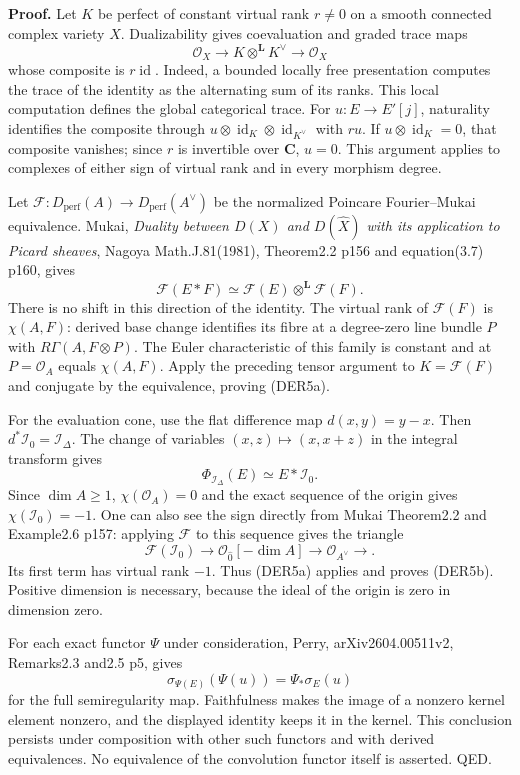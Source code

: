 \documentclass[11pt,a4paper]{article}
\theoremstyle{definition}
\begin{document}
\textbf{Proof.} Let \(K\) be perfect of constant virtual rank \(r\ne0\)
on a smooth connected complex variety \(X\). Dualizability gives
coevaluation and graded trace maps \[
 \mathcal O_X\longrightarrow K\otimes^{\mathbf L}K^\vee
 \longrightarrow\mathcal O_X
\] whose composite is \(r\operatorname{id}\). Indeed, a bounded locally
free presentation computes the trace of the identity as the alternating
sum of its ranks. This local computation defines the global categorical
trace. For \(u:E\to E'[j]\), naturality identifies the composite through
\(u\otimes\operatorname{id}_K\otimes\operatorname{id}_{K^\vee}\) with
\(ru\). If \(u\otimes\operatorname{id}_K=0\), that composite vanishes;
since \(r\) is invertible over \(\mathbf C\), \(u=0\). This argument
applies to complexes of either sign of virtual rank and in every
morphism degree.

Let \(\mathcal F:D_{\mathrm{perf}}(A)\to D_{\mathrm{perf}}(A^\vee)\) be
the normalized Poincare Fourier--Mukai equivalence. Mukai, \emph{Duality
between \(D(X)\) and \(D(\widehat X)\) with its application to Picard
sheaves}, Nagoya Math.J.81(1981), Theorem2.2 p156 and equation(3.7)
p160, gives \[
 \mathcal F(E*F)\simeq
 \mathcal F(E)\otimes^{\mathbf L}\mathcal F(F).
\tag{DER5c}
\] There is no shift in this direction of the identity. The virtual rank
of \(\mathcal F(F)\) is \(\chi(A,F)\): derived base change identifies
its fibre at a degree-zero line bundle \(P\) with
\(R\Gamma(A,F\otimes P)\). The Euler characteristic of this family is
constant and at \(P=\mathcal O_A\) equals \(\chi(A,F)\). Apply the
preceding tensor argument to \(K=\mathcal F(F)\) and conjugate by the
equivalence, proving (DER5a).

For the evaluation cone, use the flat difference map \(d(x,y)=y-x\).
Then \(d^*\mathcal I_0=\mathcal I_\Delta\). The change of variables
\((x,z)\mapsto(x,x+z)\) in the integral transform gives \[
 \Phi_{\mathcal I_\Delta}(E)\simeq E*\mathcal I_0.
\] Since \(\dim A\ge1\), \(\chi(\mathcal O_A)=0\) and the exact sequence
of the origin gives \(\chi(\mathcal I_0)=-1\). One can also see the sign
directly from Mukai Theorem2.2 and Example2.6 p157: applying
\(\mathcal F\) to this sequence gives the triangle \[
 \mathcal F(\mathcal I_0)\longrightarrow
 \mathcal O_{\widehat0}[-\dim A]\longrightarrow
 \mathcal O_{A^\vee}\longrightarrow.
\] Its first term has virtual rank \(-1\). Thus (DER5a) applies and
proves (DER5b). Positive dimension is necessary, because the ideal of
the origin is zero in dimension zero.

For each exact functor \(\Psi\) under consideration, Perry,
arXiv2604.00511v2, Remarks2.3 and2.5 p5, gives \[
 \sigma_{\Psi(E)}(\Psi(u))=\Psi_*\sigma_E(u)
\] for the full semiregularity map. Faithfulness makes the image of a
nonzero kernel element nonzero, and the displayed identity keeps it in
the kernel. This conclusion persists under composition with other such
functors and with derived equivalences. No equivalence of the
convolution functor itself is asserted. QED.
\end{document}
